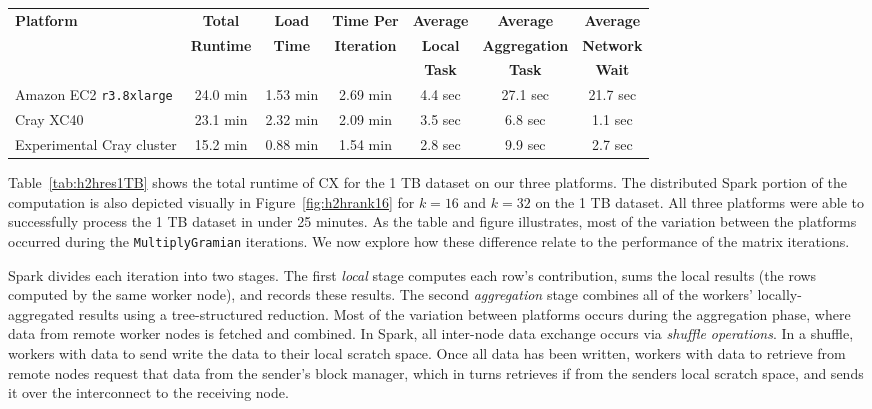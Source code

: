     \begin{table*}
    \begin{center}
    \begin{tabular}{| l | c | c | c | c | c | c |}
    \toprule
    \textbf{Platform} & \textbf{Total} & \textbf{Load} & \textbf{Time Per} & \textbf{Average} & \textbf{Average} & \textbf{Average} \\
                               & \textbf{Runtime} & \textbf{Time} & \textbf{Iteration} & \textbf{Local} & \textbf{Aggregation} & \textbf{Network} \\
                               & & & & \textbf{Task} & \textbf{Task} & \textbf{Wait} \\
    \midrule
    Amazon EC2 \texttt{r3.8xlarge} & 24.0 min & 1.53 min & 2.69 min & 4.4 sec & 27.1 sec & 21.7 sec \\
    \midrule
    Cray XC40 & 23.1 min& 2.32 min & 2.09 min &  3.5 sec & 6.8 sec & 1.1 sec \\
    \midrule
    Experimental Cray cluster & 15.2 min & 0.88 min & 1.54 min &  2.8 sec & 9.9 sec & 2.7 sec \\
   \bottomrule
    \end{tabular}
    \end{center}
    \caption{Total runtime for the 1 TB dataset ($k=16$), broken down into load time and per-iteration time. The per-iteration time is further broken down into the average time for each task of the local stage and each task of the aggregation stage.  We also show the average amount of time spent waiting for a network fetch, to illustrate the impact of the interconnect.}
    \label{tab:h2hres1TB}
    \end{table*}
    
Table~\ref{tab:h2hres1TB} shows the total runtime of CX for the 1 TB dataset on
our three platforms.  The distributed Spark portion of the computation is also
depicted visually in Figure~\ref{fig:h2hrank16} for $k=16$ and $k=32$ on the 1
TB dataset.  All three platforms were able to successfully process the 1 TB
dataset in under 25 minutes.  As the table and figure illustrates, most of the
variation between the platforms occurred during the \texttt{MultiplyGramian}
iterations.  We now explore how these difference relate to the performance of the matrix
iterations.

Spark divides each iteration into two stages.  The first \emph{local}
stage computes each row's contribution, sums the local results (the
rows computed by the same worker node), and records these %
results.  The second \emph{aggregation} stage combines all of the workers' locally-aggregated results using a tree-structured reduction.  Most of the variation between platforms occurs during the aggregation phase, where data from remote worker nodes is fetched and combined.  In Spark, all inter-node data exchange occurs via \emph{shuffle operations}.  In a shuffle, workers with data to send write the data to their local scratch space.  Once all data has been written, workers with data to retrieve from remote nodes request that data from the sender's block manager, which in turns retrieves if from the senders local scratch space, and sends it over the interconnect to the receiving node.

